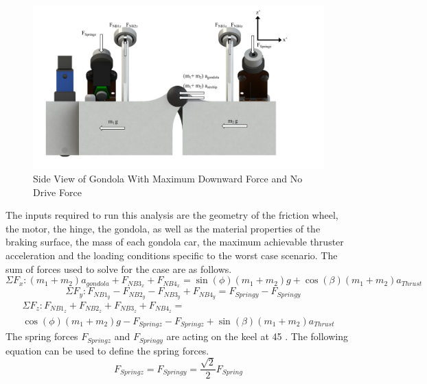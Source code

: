 \documentclass[../main.tex]{subfiles}
\begin{document}
\begin{figure}[H]
	\centering
	\includegraphics[width=1.1\textwidth]{img/gondola/sideGondolaNoDrive.pdf}
	\caption{Side View of Gondola With Maximum Downward Force and No Drive Force}
	\label{fig:sideGondolaNoDrive}
\end{figure}

The inputs required to run this analysis are the geometry of the friction wheel, the motor, the hinge, the gondola, as well as the material properties of the braking surface, the mass of each gondola car, the maximum achievable thruster acceleration and the loading conditions specific to the worst case scenario. The sum of forces used to solve for the case are as follows. 
\begin{equation} \label{FxGondLA}
\Sigma F_{x} : (m_{1}+m_{2}) a_{gondola} + F_{NB3_{x}} + F_{NB4_{x}} = \sin(\phi) (m_{1} + m_2)g + \cos(\beta) (m_1+m_2) a_{Thrust} 
\end{equation}
\begin{equation} \label{FyGondLA}
\hspace{12pt}\Sigma F_{y} : F_{NB1_{y}} - F_{NB2_{y}} - F_{NB3_{y}} + F_{NB4_{y}} =  F_{Springy} -F_{Springy} 
\end{equation}
\begin{multline} \label{FzGondLA}
\Sigma F_{z} : F_{NB1_{z}} + F_{NB2_{z}} + F_{NB3_{z}} + F_{NB4_{z}} =\\ \cos(\phi) (m_{1} + m_2)g -  F_{Springz} - F_{Springz} + \sin(\beta) (m_1+m_2) a_{Thrust}
\end{multline}
The spring forces $F_{Springz}$ and $F_{Springy}$ are acting on the keel at 45 \textdegree. The following equation can be used to define the spring forces. 
\begin{equation}
F_{Springz} = F_{Springy} = \frac{\sqrt{2}}{2} F_{Spring}
\end{equation} \\
\end{document}
